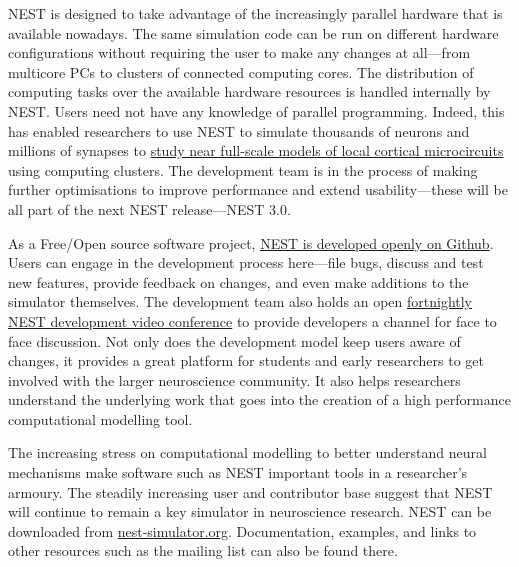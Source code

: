 \documentclass[12pt,a4paper]{article}
\begin{document}
NEST is designed to take advantage of the increasingly parallel hardware that is available nowadays.
The same simulation code can be run on different hardware configurations without requiring the user to make any changes at all---from multicore PCs to clusters of connected computing cores.
The distribution of computing tasks over the available hardware resources is handled internally by NEST\@.
Users need not have any knowledge of parallel programming.
Indeed, this has enabled researchers to use NEST to simulate thousands of neurons and millions of synapses to \href{https://academic.oup.com/cercor/article/24/3/785/398560}{study near full-scale models of local cortical microcircuits} using computing clusters.
The development team is in the process of making further optimisations to improve performance and extend usability---these will be all part of the next NEST release---NEST 3.0.

As a Free/Open source software project, \href{https://github.com/nest/nest-simulator}{NEST is developed openly on Github}.
Users can engage in the development process here---file bugs, discuss and test new features, provide feedback on changes, and even make additions to the simulator themselves.
The development team also holds an open \href{https://github.com/nest/nest-simulator/wiki/Open-NEST-Developer-Video-Conference }{fortnightly NEST development video conference} to provide developers a channel for face to face discussion.
Not only does the development model keep users aware of changes, it provides a great platform for students and early researchers to get involved with the larger neuroscience community.
It also helps researchers understand the underlying work that goes into the creation of a high performance computational modelling tool.


The increasing stress on computational modelling to better understand neural mechanisms make software such as NEST important tools in a researcher's armoury.
The steadily increasing user and contributor base suggest that NEST will continue to remain a key simulator in neuroscience research.
NEST can be downloaded from \href{http://nest-simulator.org/download/}{nest-simulator.org}.
Documentation, examples, and links to other resources such as the mailing list can also be found there.
\end{document}
